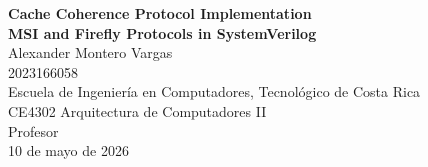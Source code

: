 \documentclass[12pt]{article}
\begin{document}
\thispagestyle{empty}
\vspace*{\fill}
\begin{center}
    \textbf{\LARGE Cache Coherence Protocol Implementation} \\[0.5cm]
    \textbf{\LARGE MSI and Firefly Protocols in SystemVerilog} \\[1.5cm]
    
    \Large Alexander Montero Vargas \\[0.3cm]
    \Large 2023166058 \\[0.8cm]
    
    \large Escuela de Ingeniería en Computadores, Tecnológico de Costa Rica \\[0.3cm]
    \large CE4302 Arquitectura de Computadores II \\[1.2cm]
    
    \large Profesor \\[1.2cm]
    
    \large 10 de mayo de 2026
\end{center}
\vspace*{\fill}
\end{document}
